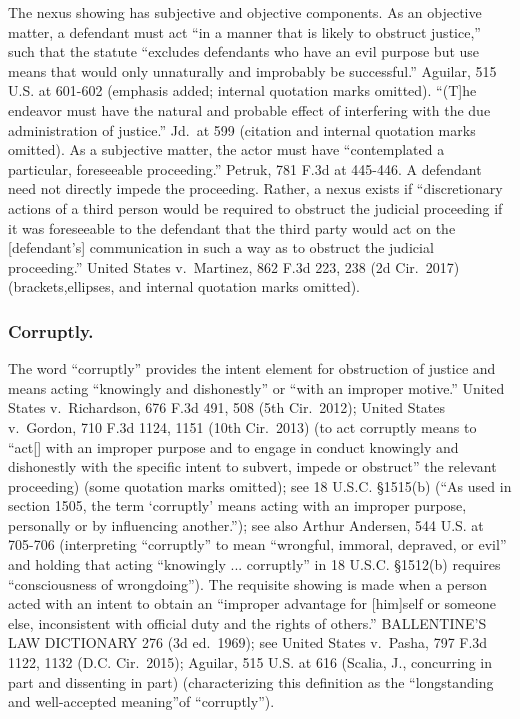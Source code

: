 The nexus showing has subjective and objective components.
As an objective matter, a defendant must act “in a manner that is likely to obstruct justice,” such that the statute “excludes defendants who have an evil purpose but use means that would only unnaturally and improbably be successful.”
Aguilar, 515 U.S. at 601-602 (emphasis added; internal quotation marks omitted).
“(T]he endeavor must have the natural and probable effect of interfering with the due administration of justice.”
Jd.\ at 599 (citation and internal quotation marks omitted).
As a subjective matter, the actor must have “contemplated a particular, foreseeable proceeding.”
Petruk, 781 F.3d at 445-446.
A defendant need not directly impede the proceeding.
Rather, a nexus exists if “discretionary actions of a third person would be required to obstruct the judicial proceeding if it was foreseeable to the defendant that the third party would act on the [defendant’s] communication in such a way as to obstruct the judicial proceeding.”
United States v.\ Martinez, 862 F.3d 223, 238 (2d Cir.~2017) (brackets,ellipses, and internal quotation marks omitted).

\subsubsection*{Corruptly.}
The word “corruptly” provides the intent element for obstruction of justice and means acting “knowingly and dishonestly” or “with an improper motive.”
United States v.\ Richardson, 676 F.3d 491, 508 (5th Cir.~2012);
United States v.\ Gordon, 710 F.3d 1124, 1151 (10th Cir.~2013) (to act corruptly means to “act[] with an improper purpose and to engage in conduct knowingly and dishonestly with the specific intent to subvert, impede or obstruct” the relevant proceeding) (some quotation marks omitted);
see 18 U.S.C. \S 1515(b) (“As used in section 1505, the term ‘corruptly’ means acting with an improper purpose, personally or by influencing another.”);
see also Arthur Andersen, 544 U.S. at 705-706 (interpreting “corruptly” to mean “wrongful, immoral, depraved, or evil” and holding that acting “knowingly ... corruptly” in 18 U.S.C. \S 1512(b) requires “consciousness of wrongdoing”).
The requisite showing is made when a person acted with an intent to obtain an “improper advantage for [him]self or someone else, inconsistent with official duty and the rights of others.”
BALLENTINE’S LAW DICTIONARY 276 (3d ed.~1969);
see United States v.\ Pasha, 797 F.3d 1122, 1132 (D.C. Cir.~2015);
Aguilar, 515 U.S. at 616 (Scalia, J., concurring in part and dissenting in part) (characterizing this definition as the “longstanding and well-accepted meaning”of “corruptly”).

